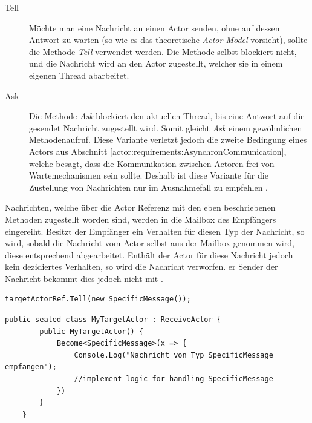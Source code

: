 \begin{description}
    \item[Tell] Möchte man eine Nachricht an einen Actor senden, ohne auf dessen Antwort zu warten (so wie es das theoretische \textit{Actor Model} vorsieht), sollte die Methode \textit{Tell} verwendet werden. Die Methode selbst blockiert nicht, und die Nachricht wird an den Actor zugestellt, welcher sie in einem eigenen Thread abarbeitet. 
% 
% 
    \item[Ask] Die Methode \textit{Ask} blockiert den aktuellen Thread, bis eine Antwort auf die gesendet Nachricht zugestellt wird. Somit gleicht \textit{Ask} einem gewöhnlichen Methodenaufruf. Diese Variante verletzt jedoch die zweite Bedingung eines Actors aus Abschnitt \ref{actor:requirements:AsynchronCommunication}, welche besagt, dass die Kommunikation zwischen Actoren frei von Wartemechanismen sein sollte. Deshalb ist diese Variante für die Zustellung von Nachrichten nur im Ausnahmefall zu empfehlen \citep{Akka.netCommunityAkka.NETDocumentation}.  
\end{description}
Nachrichten, welche über die Actor Referenz mit den eben beschriebenen Methoden zugestellt worden sind, werden in die Mailbox des Empfängers eingereiht. Besitzt der Empfänger ein Verhalten für diesen Typ der Nachricht, so wird, sobald die Nachricht vom Actor selbst aus der Mailbox genommen wird, diese entsprechend abgearbeitet. Enthält der Actor für diese Nachricht jedoch kein de­zi­diertes Verhalten, so wird die Nachricht verworfen. er Sender der Nachricht bekommt dies jedoch nicht mit \citep{akkaInAction}.  

\begin{lstlisting}[caption=Versenden einer Nachricht an einen anderen Actor, label=code:actor:TellMethod]
    targetActorRef.Tell(new SpecificMessage());
\end{lstlisting}

\begin{lstlisting}[caption=Hier wird für den Actor \textit{MyTargetActor} das Verhalten für eine einkommende Nachricht vom Typ \textit{SpecificMessage} festgellegt., label=lst:test]
    public sealed class MyTargetActor : ReceiveActor {
        public MyTargetActor() {
            Become<SpecificMessage>(x => {
                Console.Log("Nachricht von Typ SpecificMessage empfangen");
                //implement logic for handling SpecificMessage
            })
        }
    }    
\end{lstlisting}

